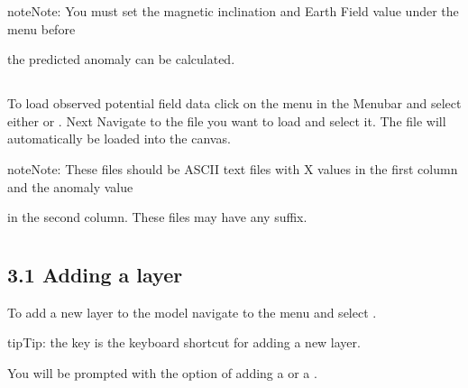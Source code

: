 \documentclass[a4paper,12pt,english]{sphinxmanual}
\begin{document}
\begin{sphinxadmonition}{note}{Note:}
You must set the magnetic inclination and Earth Field value under the  menu before
\end{sphinxadmonition}

the predicted anomaly can be calculated.


\subsection{}
\label{\detokenize{manual__PF:loading-observed-potential-field-data}}
To load observed potential field data click on the  menu in the Menubar and select either
 or .
Next Navigate to the file you want to load and select it.
The file will automatically be loaded into the canvas.

\begin{sphinxadmonition}{note}{Note:}
These files should be ASCII text files with X values in the first column and the anomaly value
\end{sphinxadmonition}

in the second column. These files may have any suffix.


\section{}
\label{\detokenize{manual__layer_nodes:model-layers}}\label{\detokenize{manual__layer_nodes::doc}}

\subsection{3.1 Adding a layer}
\label{\detokenize{manual__layer_nodes:adding-a-layer}}
To add a new layer to the model navigate to the  menu and select .

\begin{sphinxadmonition}{tip}{Tip:}
the  key is the keyboard shortcut for adding a new layer.
\end{sphinxadmonition}

You will be prompted with the option of adding a  or a .
\end{document}
